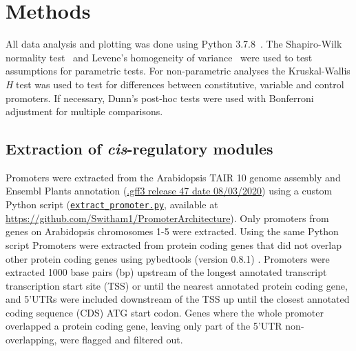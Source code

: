 \documentclass[../main.tex]{subfiles}
\begin{document}
\section{Methods}
\label{chapter1:methods}
All data analysis and plotting was done using Python 3.7.8~\autocite{pythoncoreteamPythonDynamicOpen2020}.
The Shapiro\hyp{}Wilk normality test~\autocite{shapiroAnalysisVarianceTest1965} and Levene's homogeneity of variance~\autocite{leveneRobustTestsEquality1960} were used to test assumptions for parametric tests.
For non\hyp{}parametric analyses the Kruskal\hyp{}Wallis \textit{H} test \autocite{kruskalUseRanksOneCriterion1952} was used to test for differences between constitutive, variable and control promoters.
If necessary, Dunn's post\hyp{}hoc tests \autocite{dunnMultipleComparisonsUsing1964} were used with Bonferroni adjustment for multiple comparisons.

\subsection{Extraction of \textit{cis}-regulatory modules}\label{chapter1:methods:extraction-of-cis-regulatory-modules}

Promoters were extracted from the Arabidopsis TAIR 10 \autocite{lameschArabidopsisInformationResource2012} genome assembly and Ensembl Plants \autocite{howeEnsemblGenomes20202020} annotation (\href{ftp://ftp.ensemblgenomes.org/pub/release-47/plants/gff3/arabidopsis_thaliana/}{.gff3 release 47 date 08/03/2020}) using a custom Python script (\href{https://github.com/Switham1/PromoterArchitecture/blob/master/src/data_sorting/extract_promoter.py}{\texttt{extract\_promoter.py}}, available at \url{https://github.com/Switham1/PromoterArchitecture}).
Only promoters from genes on Arabidopsis chromosomes 1-5 were extracted.
Using the same Python script Promoters were extracted from protein coding genes that did not overlap other protein coding genes using pybedtools (version 0.8.1) \autocite{dalePybedtoolsFlexiblePython2011}.
Promoters were extracted 1000 base pairs (bp) upstream of the longest annotated transcript transcription start site (TSS) or until the nearest annotated protein coding gene, and 5'UTRs were included downstream of the TSS up until the closest annotated coding sequence (CDS) ATG start codon.
Genes where the whole promoter overlapped a protein coding gene, leaving only part of the 5'UTR non-overlapping, were flagged and filtered out.
\end{document}
